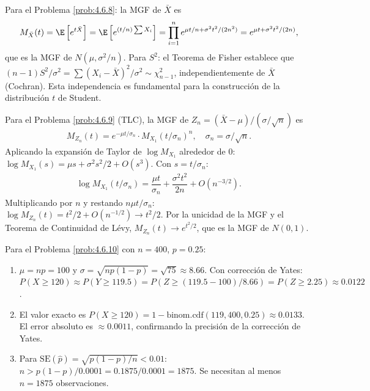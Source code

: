\begin{solucion}
	\label{sol:4.6.8}
	Para el Problema \ref{prob:4.6.8}: la MGF de $\bar{X}$ es
	\begin{align*}
		M_{\bar{X}}(t) = \E\left[e^{t\bar{X}}\right] = \E\left[e^{(t/n)\sum X_{i}}\right] = \prod_{i=1}^{n} e^{\mu t/n + \sigma^{2}t^{2}/(2n^{2})} = e^{\mu t + \sigma^{2}t^{2}/(2n)},
	\end{align*}
	que es la MGF de $N(\mu, \sigma^{2}/n)$. Para $S^{2}$: el Teorema de Fisher establece que $(n-1)S^{2}/\sigma^{2} = \sum(X_{i} - \bar{X})^{2}/\sigma^{2} \sim \chi^{2}_{n-1}$, independientemente de $\bar{X}$ (Cochran). Esta independencia es fundamental para la construcción de la distribución $t$ de Student. \quad \qedhere
\end{solucion}

\begin{solucion}
	\label{sol:4.6.9}
	Para el Problema \ref{prob:4.6.9} (TLC), la MGF de $Z_{n} = (\bar{X} - \mu)/(\sigma/\sqrt{n})$ es
	\begin{align*}
		M_{Z_{n}}(t) = e^{-\mu t/\sigma_n} \cdot M_{X_{1}}(t/\sigma_n)^{n}, \quad \sigma_n = \sigma/\sqrt{n}.
	\end{align*}
	Aplicando la expansión de Taylor de $\log M_{X_{1}}$ alrededor de 0: $\log M_{X_{1}}(s) = \mu s + \sigma^{2}s^{2}/2 + O(s^{3})$. Con $s = t/\sigma_n$:
	\begin{align*}
		\log M_{X_{1}}(t/\sigma_n) = \dfrac{\mu t}{\sigma_n} + \dfrac{\sigma^{2}t^{2}}{2n} + O(n^{-3/2}).
	\end{align*}
	Multiplicando por $n$ y restando $n\mu t/\sigma_n$: $\log M_{Z_{n}}(t) = t^{2}/2 + O(n^{-1/2}) \to t^{2}/2$. Por la unicidad de la MGF y el Teorema de Continuidad de Lévy, $M_{Z_{n}}(t) \to e^{t^{2}/2}$, que es la MGF de $N(0, 1)$. \quad \qedhere
\end{solucion}

\begin{solucion}
	\label{sol:4.6.10}
	Para el Problema \ref{prob:4.6.10} con $n = 400$, $p = 0.25$:
	\begin{enumerate}
		\item $\mu = np = 100$ y $\sigma = \sqrt{np(1-p)} = \sqrt{75} \approx 8.66$. Con corrección de Yates: $P(X \ge 120) \approx P(Y \ge 119.5) = P(Z \ge (119.5 - 100)/8.66) = P(Z \ge 2.25) \approx 0.0122$.
		\item El valor exacto es $P(X \ge 120) = 1 - \text{binom.cdf}(119, 400, 0.25) \approx 0.0133$. El error absoluto es $\approx 0.0011$, confirmando la precisión de la corrección de Yates.
		\item Para $\text{SE}(\hat{p}) = \sqrt{p(1-p)/n} < 0.01$: $n > p(1-p)/0.0001 = 0.1875/0.0001 = 1875$. Se necesitan al menos $n = 1875$ observaciones.
	\end{enumerate}
\end{solucion}

